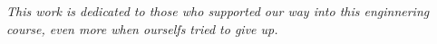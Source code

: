 \begin{dedication}
   \vspace*{\fill}
   \centering
   \noindent
   \textit{ This work is dedicated to those who supported our way into this
   enginnering course, even more when ourselfs tried to give up. } \vspace*{\fill}
\end{dedication}
